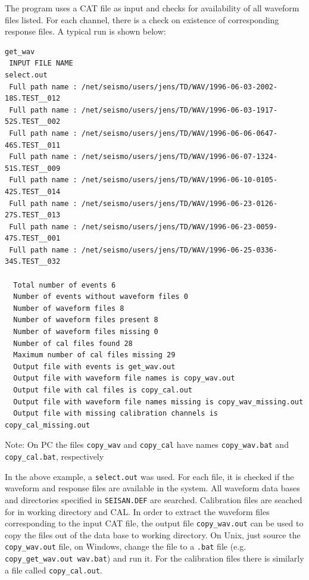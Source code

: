 The program uses a CAT file as input and checks for availability of 
all waveform files listed. For each channel, there is a check on 
existence of corresponding response files. A typical run is shown below: 

\begin{verbatim}
get_wav
 INPUT FILE NAME 
select.out
 Full path name : /net/seismo/users/jens/TD/WAV/1996-06-03-2002-18S.TEST__012
 Full path name : /net/seismo/users/jens/TD/WAV/1996-06-03-1917-52S.TEST__002
 Full path name : /net/seismo/users/jens/TD/WAV/1996-06-06-0647-46S.TEST__011
 Full path name : /net/seismo/users/jens/TD/WAV/1996-06-07-1324-51S.TEST__009
 Full path name : /net/seismo/users/jens/TD/WAV/1996-06-10-0105-42S.TEST__014
 Full path name : /net/seismo/users/jens/TD/WAV/1996-06-23-0126-27S.TEST__013
 Full path name : /net/seismo/users/jens/TD/WAV/1996-06-23-0059-47S.TEST__001
 Full path name : /net/seismo/users/jens/TD/WAV/1996-06-25-0336-34S.TEST__032 

  Total number of events 6
  Number of events without waveform files 0
  Number of waveform files 8
  Number of waveform files present 8
  Number of waveform files missing 0
  Number of cal files found 28 
  Maximum number of cal files missing 29
  Output file with events is get_wav.out  
  Output file with waveform file names is copy_wav.out
  Output file with cal files is copy_cal.out
  Output file with waveform file names missing is copy_wav_missing.out
  Output file with missing calibration channels is copy_cal_missing.out 
\end{verbatim}

Note: On PC the files \texttt{copy\_wav} and \texttt{copy\_cal} 
have names \texttt{copy\_wav.bat} and \texttt{copy\_cal.bat},  
respectively 

In the above example, a \texttt{select.out} was used. For each file, it is 
checked if the waveform and response files are available in the system. 
All waveform data bases and directories specified in \texttt{SEISAN.DEF} 
are searched. Calibration files are seached for in working directory 
and CAL. In order to extract the waveform files corresponding to 
the input CAT file, the output file 
\texttt{copy\_wav.out} can be used to copy the files 
out of the data base to working directory. On Unix, just source the 
\texttt{copy\_wav.out} file, on Windows, change the file to a 
\texttt{.bat} file (e.g. 
\texttt{copy\_get\_wav.out wav.bat}) and run it. For the calibration 
files there is similarly a file called \texttt{copy\_cal.out}. 


